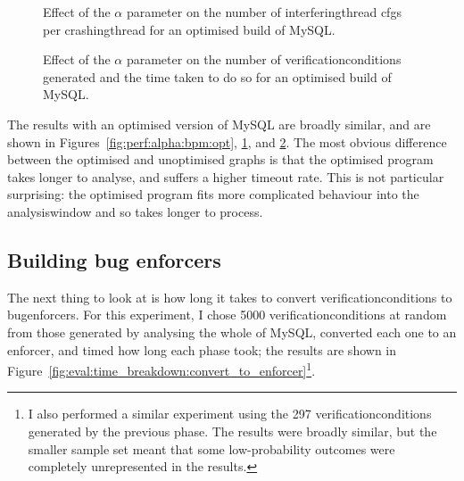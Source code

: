 \begin{figure}
  
  \caption{Effect of the $\alpha$ parameter on the number of
    \gls{interferingthread} \glspl{cfg} per \gls{crashingthread}
        {\StateMachine} for an optimised build of MySQL.  }
  \label{fig:perf:alpha:gsc:opt}
\end{figure}

\begin{figure}
  
  \caption{Effect of the $\alpha$ parameter on the number of
    \glspl{verificationcondition} generated and the time taken to do
    so for an optimised build of MySQL.}
  \label{fig:perf:alpha:gvc:opt}
\end{figure}

The results with an optimised version of MySQL are broadly similar,
and are shown in Figures~\ref{fig:perf:alpha:bpm:opt},
\ref{fig:perf:alpha:gsc:opt}, and \ref{fig:perf:alpha:gvc:opt}.  The
most obvious difference between the optimised and unoptimised graphs
is that the optimised program takes longer to analyse, and suffers a
higher timeout rate.  This is not particular surprising: the optimised
program fits more complicated behaviour into the \gls{analysiswindow}
and so takes longer to process.  

\subsection{Building bug enforcers}

The next thing to look at is how long it takes to convert
\glspl{verificationcondition} to \glspl{bugenforcer}.  For this
experiment, I chose 5000 \glspl{verificationcondition} at random from
those generated by analysing the whole of MySQL, converted each one to
an enforcer, and timed how long each phase took; the results are shown
in Figure~\ref{fig:eval:time_breakdown:convert_to_enforcer}\footnote{I
  also performed a similar experiment using the 297
  \glspl{verificationcondition} generated by the previous phase.  The
  results were broadly similar, but the smaller sample set meant that
  some low-probability outcomes were completely unrepresented in the
  results.}.

